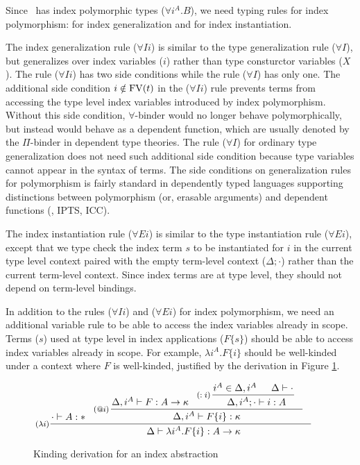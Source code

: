 Since \Fi\ has index polymorphic types ($\forall i^A . B$),
we need typing rules for index polymorphism:
 for index generalization
and  for index instantiation.

The index generalization rule ($\forall I i$) is similar to
the type generalization rule ($\forall I$), but generalizes over
index variables ($i$) rather than type consturctor variables ($X$).
The rule ($\forall I i$) has two side conditions
while the rule ($\forall I$) has only one.
The additional side condition $i\notin\mathop{\mathrm{FV}}(t)$ in the ($\forall I i$) rule
prevents terms from accessing the type level index variables introduced by
index polymorphism. Without this side condition, $\forall$-binder
would no longer behave polymorphically, but instead would behave as
a dependent function, which are usually denoted by the $\Pi$-binder in
dependent type theories. The rule ($\forall I$) for ordinary
type generalization does not need such additional side condition
because type variables cannot appear in the syntax of terms.
The side conditions on generalization rules for polymorphism is fairly standard
in dependently typed languages supporting distinctions between polymorphism
(or, erasable arguments) and dependent functions (\eg, IPTS\cite{LingerS08},
ICC\cite{Miquel01}).

The index instantiation rule ($\forall E i$) is similar to
the type instantiation rule ($\forall E i$), except that
we type check the index term $s$ to be instantiated for $i$
in the current type level context paired with the empty term-level context
($\Delta;\cdot$) rather than the current term-level context.
Since index terms are at type level, they should not depend on
term-level bindings.

In addition to the rules ($\forall I i$) and ($\forall E i$) for
index polymorphism, we need an additional variable rule 
to be able to access the index variables already in scope. Terms ($s$) used
at type level in index applications ($F\{s\}$) should be able to access
index variables already in scope. For example, $\lambda i^A.F\{i\}$ should be
well-kinded under a context where $F$ is well-kinded,
justified by the derivation in Figure \ref{fig:ivarexample}.

\begin{figure}
\[ \!\!\!\!\!\!\!\!\inference[($\lambda i$)]
      { \!\!\!\! \cdot |- A:* \!\!\!\!&
	\inference[($@i$)\!\!\!]{ \!\!\!\!\Delta, i^A |- F : A -> \kappa
                          & \!\!\!\!\inference[($:i$)\!\!\!]{\!\!\!\! i^A\in \Delta,i^A
                                              & \Delta |- \cdot \!\!\!\!}
                                              {\Delta,i^A;\cdot |- i:A\!\!\!\!}
                          }
                          {\Delta, i^A |- F\{i\} : \kappa} }
      {\Delta |- \lambda i^A.F\{i\} :A -> \kappa\!\!\!\!\!\!\!\!\!\!\!\!\!\!\!\!}
\]
\caption{Kinding derivation for an index abstraction}
\label{fig:ivarexample}
\end{figure}

